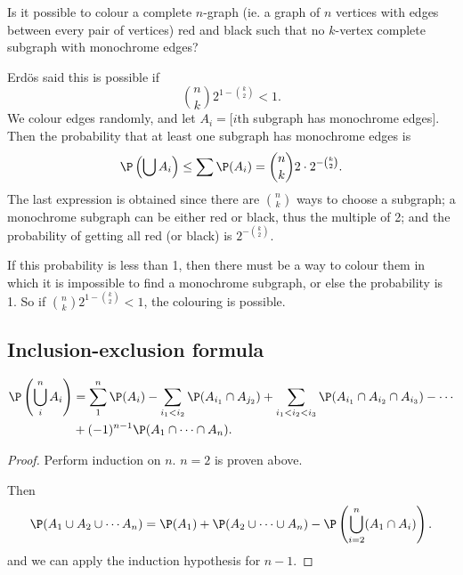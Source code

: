 \documentclass[a4paper]{article}
\begin{document}
\begin{eg}[Erdos 1947]
  Is it possible to colour a complete $n$-graph (ie. a graph of $n$ vertices with edges between every pair of vertices) red and black such that no $k$-vertex complete subgraph with monochrome edges?

  Erd\"os said this is possible if
  \[
    \binom{n}{k} 2^{1 - \binom{k}{2}} < 1.
  \]
  We colour edges randomly, and let $A_i=[i$th subgraph has monochrome edges$]$. Then the probability that at least one subgraph has monochrome edges is
  \[
    \P\left(\bigcup A_i\right) \leq \sum \P(A_i) = \binom{n}{k} 2\cdot 2^{-\binom{k}{2}}.
  \]
  The last expression is obtained since there are $\binom{n}{k}$ ways to choose a subgraph; a monochrome subgraph can be either red or black, thus the multiple of 2; and the probability of getting all red (or black) is $2^{-\binom{k}{2}}$.

  If this probability is less than 1, then there must be a way to colour them in which it is impossible to find a monochrome subgraph, or else the probability is 1. So if $\binom{n}{k} 2^{1 - \binom{k}{2}} < 1$, the colouring is possible.
\end{eg}

\subsection{Inclusion-exclusion formula}
\begin{thm}
  \begin{align*}
    \P\left(\bigcup_i^n A_i\right) &= \sum_1^n \P(A_i) - \sum_{i_1 < i_2} \P(A_{i_1}\cap A_{j_2}) + \sum_{i_1 < i_2 < i_3}\P(A_{i_1}\cap A_{i_2} \cap A_{i_3}) - \cdots\\
    &+ (-1)^{n - 1} \P(A_1\cap \cdots \cap A_n).
  \end{align*}
\end{thm}

\begin{proof}
  Perform induction on $n$. $n = 2$ is proven above.

  Then
  \[
    \P(A_1\cup A_2\cup \cdots A_n) = \P(A_1) + \P(A_2\cup\cdots\cup A_n) - \P\left(\bigcup_{i = 2}^n (A_1\cap A_i)\right).
  \]
  and we can apply the induction hypothesis for $n - 1$.
\end{proof}
\end{document}
